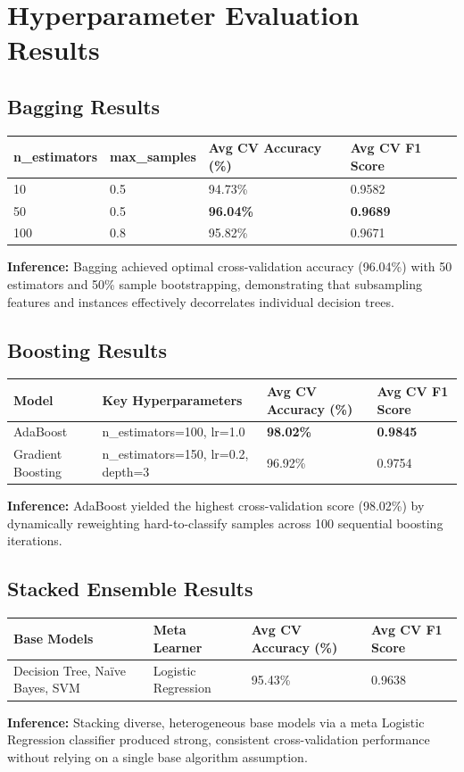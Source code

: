\documentclass[12pt,a4paper]{article}
\begin{document}
\section{Hyperparameter Evaluation Results}

\subsection*{Bagging Results}
\begin{longtable}{|p{3.5cm}|p{3.5cm}|p{3.5cm}|p{3.5cm}|}
\hline
\textbf{n\_estimators} & \textbf{max\_samples} & \textbf{Avg CV Accuracy (\%)} & \textbf{Avg CV F1 Score} \\ \hline
\endhead
10 & 0.5 & 94.73\% & 0.9582 \\ \hline
50 & 0.5 & \textbf{96.04\%} & \textbf{0.9689} \\ \hline
100 & 0.8 & 95.82\% & 0.9671 \\ \hline
\end{longtable}
\textbf{Inference:} Bagging achieved optimal cross-validation accuracy (96.04\%) with 50 estimators and 50\% sample bootstrapping, demonstrating that subsampling features and instances effectively decorrelates individual decision trees.

\subsection*{Boosting Results}
\begin{longtable}{|p{3cm}|p{3.5cm}|p{3.5cm}|p{3.5cm}|}
\hline
\textbf{Model} & \textbf{Key Hyperparameters} & \textbf{Avg CV Accuracy (\%)} & \textbf{Avg CV F1 Score} \\ \hline
\endhead
AdaBoost & n\_estimators=100, lr=1.0 & \textbf{98.02\%} & \textbf{0.9845} \\ \hline
Gradient Boosting & n\_estimators=150, lr=0.2, depth=3 & 96.92\% & 0.9754 \\ \hline
\end{longtable}
\textbf{Inference:} AdaBoost yielded the highest cross-validation score (98.02\%) by dynamically reweighting hard-to-classify samples across 100 sequential boosting iterations.

\subsection*{Stacked Ensemble Results}
\begin{longtable}{|p{4.5cm}|p{3.5cm}|p{3.5cm}|p{3.5cm}|}
\hline
\textbf{Base Models} & \textbf{Meta Learner} & \textbf{Avg CV Accuracy (\%)} & \textbf{Avg CV F1 Score} \\ \hline
\endhead
Decision Tree, Na\"ive Bayes, SVM & Logistic Regression & 95.43\% & 0.9638 \\ \hline
\end{longtable}
\textbf{Inference:} Stacking diverse, heterogeneous base models via a meta Logistic Regression classifier produced strong, consistent cross-validation performance without relying on a single base algorithm assumption.
\end{document}
